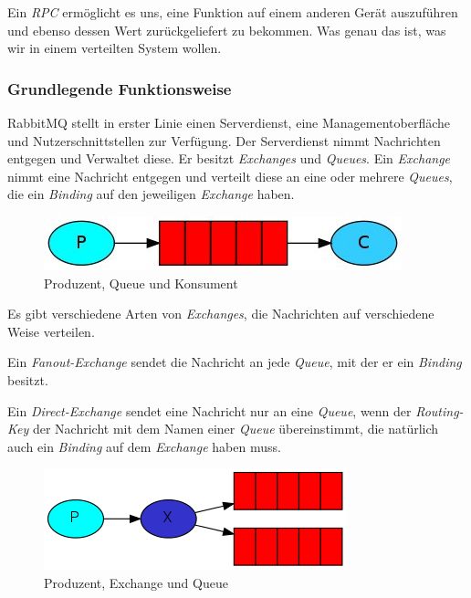\documentclass[12pt,a4paper]{scrartcl}
\begin{document}
Ein \emph{RPC} ermöglicht es uns, eine Funktion auf einem anderen Gerät auszuführen und ebenso dessen Wert zurückgeliefert zu bekommen. Was genau das ist, was wir in einem verteilten System wollen.

\subsubsection{Grundlegende Funktionsweise}

RabbitMQ stellt in erster Linie einen Serverdienst, eine Managementoberfläche und Nutzerschnittstellen zur Verfügung. Der Serverdienst nimmt Nachrichten entgegen und Verwaltet diese. 
Er besitzt \emph{Exchanges} und \emph{Queues}. Ein \emph{Exchange} nimmt eine Nachricht entgegen und verteilt diese an eine oder mehrere \emph{Queues}, die ein \emph{Binding} auf den jeweiligen \emph{Exchange} haben.

\begin{figure}[h!]
	\centering
	\includegraphics[scale=1]{P2C.jpg}
	\caption[https://www.rabbitmq.com/tutorials/tutorial-one-dotnet.html (Stand 25.09.\\2020)]{Produzent, Queue und Konsument}
\end{figure}

Es gibt verschiedene Arten von \emph{Exchanges}, die Nachrichten auf verschiedene Weise verteilen. 

Ein \emph{Fanout-Exchange} sendet die Nachricht an jede \emph{Queue}, mit der er ein \emph{Binding} besitzt. 

Ein \emph{Direct-Exchange} sendet eine Nachricht nur an eine \emph{Queue}, wenn der \emph{Routing-Key} der Nachricht mit dem Namen einer \emph{Queue} übereinstimmt, die natürlich auch ein \emph{Binding} auf dem \emph{Exchange} haben muss.

\begin{figure}[h!]
	\centering
	\includegraphics[scale=1.65]{exchanges.png}
	\caption[https://www.rabbitmq.com/tutorials/tutorial-three-dotnet.html (Stand 25.\\09.2020)]{Produzent, Exchange und Queue}
\end{figure}
\end{document}
